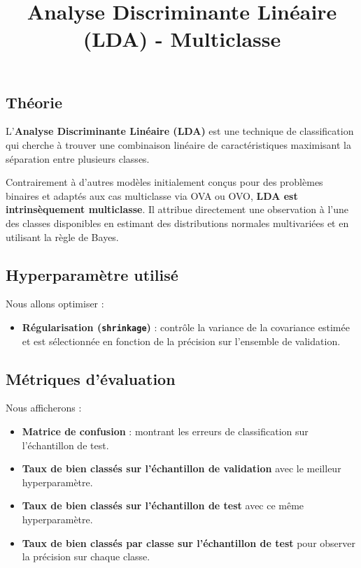\documentclass[
]{article}
\title{Analyse Discriminante Linéaire (LDA) - Multiclasse}
\author{}
\date{}
\providecommand{\tightlist}{%
  \setlength{\itemsep}{0pt}\setlength{\parskip}{0pt}}\usepackage{longtable,booktabs,array}
\begin{document}
\maketitle


\subsection{Théorie}\label{thuxe9orie}

L'\textbf{Analyse Discriminante Linéaire (LDA)} est une technique de
classification qui cherche à trouver une combinaison linéaire de
caractéristiques maximisant la séparation entre plusieurs classes.

Contrairement à d'autres modèles initialement conçus pour des problèmes
binaires et adaptés aux cas multiclasse via OVA ou OVO, \textbf{LDA est
intrinsèquement multiclasse}. Il attribue directement une observation à
l'une des classes disponibles en estimant des distributions normales
multivariées et en utilisant la règle de Bayes.

\subsection{Hyperparamètre utilisé}\label{hyperparamuxe8tre-utilisuxe9}

Nous allons optimiser :

\begin{itemize}
\tightlist
\item
  \textbf{Régularisation (\texttt{shrinkage})} : contrôle la variance de
  la covariance estimée et est sélectionnée en fonction de la précision
  sur l'ensemble de validation.
\end{itemize}

\subsection{Métriques d'évaluation}\label{muxe9triques-duxe9valuation}

Nous afficherons :

\begin{itemize}
\tightlist
\item
  \textbf{Matrice de confusion} : montrant les erreurs de classification
  sur l'échantillon de test.
\item
  \textbf{Taux de bien classés sur l'échantillon de validation} avec le
  meilleur hyperparamètre.
\item
  \textbf{Taux de bien classés sur l'échantillon de test} avec ce même
  hyperparamètre.
\item
  \textbf{Taux de bien classés par classe sur l'échantillon de test}
  pour observer la précision sur chaque classe.
\end{itemize}
\end{document}

